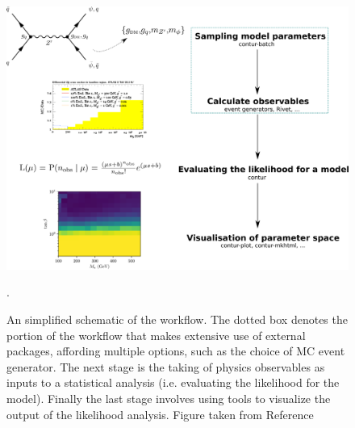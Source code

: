 \begin{figure}
  \begin{center}
    \includegraphics[width=1.0\textwidth]{Figures/contur/workflow.pdf}
    \caption{An simplified schematic of the \contur workflow. The dotted box denotes the portion of the workflow that makes extensive use of external packages, affording multiple options, such as the choice of MC event generator. The next stage is the taking of physics observables as inputs to a statistical analysis (i.e. evaluating the likelihood for the model). Finally the last stage involves using tools to visualize the output of the likelihood analysis. Figure taken from Reference~\cite{conturmanual}}.
    \label{fig:conturworkflow}
  \end{center}
\end{figure}